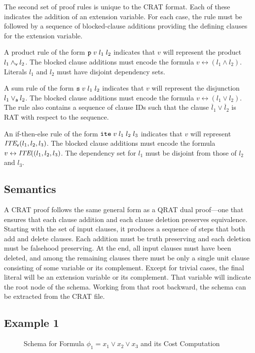 \documentclass{llncs}
\newcommand{\pand}{\mathbin{\land_{\sf v}}}
\newcommand{\por}{\mathbin{\lor_{\sf a}}}
\newcommand{\obar}[1]{\overline{#1}}
\newcommand{\ite}{\mbox{\it ITE}}
\newcommand{\pite}{\mbox{\it ITE}_{\sf v}}
\begin{document}
The second set of proof rules is unique to the CRAT format.  Each of
these indicates the addition of an extension variable.  For each case,
the rule must be followed by a sequence of blocked-clause additions
providing the defining clauses for the extension variable.

A product rule of the form ${\tt p}\;v\;l_1\;l_2$ indicates that $v$
will represent the product $l_1 \pand l_2$.  The blocked clause
additions must encode the formula $v \leftrightarrow (l_1 \land l_2)$.
Literals $l_1$ and $l_2$ must have disjoint dependency sets.

A sum rule of the form ${\tt s}\;v\;l_1\;l_2$ indicates that $v$ will
represent the disjunction $l_1 \por l_2$.  The blocked clause
additions must encode the formula $v \leftrightarrow (l_1 \lor l_2)$.
The rule also contains a sequence of clause IDs such that the clause
$\obar{l}_1 \lor \obar{l}_2$ is RAT with respect to the sequence.

An if-then-else rule of the form ${\tt ite}\;v\;l_1\;l_2\;l_3$
indicates that $v$ will represent $\pite(l_1, l_2, l_3)$.  The blocked
clause additions must encode the formula
$v \leftrightarrow \ite((l_1,l_2, l_3)$.
The dependency set for $l_1$ must be disjoint from those
of $l_2$ and $l_3$.


\subsection{Semantics}

A CRAT proof follows the same general form as a QRAT dual proof---one
that ensures that each clause addition and each clause deletion preserves
equivalence.  Starting with the set of input clauses, it produces a
sequence of steps that both add and delete clauses.  Each addition
must be truth preserving and each deletion must be falsehood
preserving.  At the end, all input clauses must have been deleted, and
among the remaining clauses there must be only a single unit clause consisting of some variable or
its complement.  Except for trivial cases, the final literal will be
an extension variable or its complement.  That variable will indicate the root node of the schema.
Working from that root backward, the schema can be extracted from the CRAT file.

\subsection{Example 1}

\begin{figure}
\caption{Schema for Formula $\phi_1 = x_1 \lor x_2 \lor x_3$ and its Cost Computation}
\label{fig:c3:schema}
\end{figure}
\end{document}
